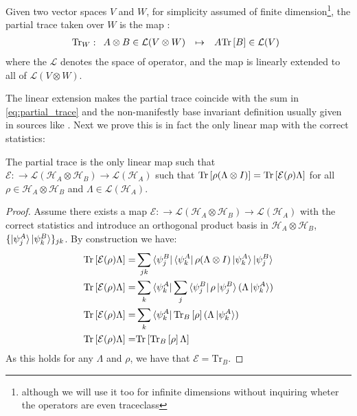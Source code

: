 \begin{definition}
  Given two vector spaces $V$ and $W$, for simplicity assumed of finite dimension\footnote{although we will use it too for infinite dimensions without inquiring wheter the operators are even traceclass}, the partial trace taken over $W$ is the map \cite{nielsen_quantum_2010}:
\[
\mathrm{Tr}_{W}: \begin{array}{rcl}
A\otimes B \in \mathcal{L}(V\otimes W)& \mapsto & A \mathrm{Tr}\left[B\right] \in \mathcal{L}(V)
\end{array}
\]
where the $\mathcal{L}$ denotes the space of operator, and the map is  linearly extended to all of $\mathcal{L}(V\otimes W)$.
\end{definition}
The linear extension makes the partial trace coincide with the sum in \eqref{eq:partial_trace} and the non-manifestly base invariant definition
usually given in sources like \cite{maziero2017computing}. Next we prove this is in fact the only linear map with the correct statistics:
\begin{theorem}
  The partial trace is the only linear map such that $\mathcal{E}:\to \mathcal{L}(\mathcal{H}_{A}\otimes \mathcal{H}_{B}) \to \mathcal{L}(\mathcal{H}_{A})$
  such that $\mathrm{Tr}\left[\rho (\Lambda\otimes I)\right] = \mathrm{Tr}\left[\mathcal{E}(\rho)\Lambda\right]$ for all $\rho \in \mathcal{H}_{A}\otimes \mathcal{H}_{B}$ and
  $\Lambda \in \mathcal{L}(\mathcal{H}_{A})$.
\end{theorem}
\begin{proof}
  Assume there exists a map $\mathcal{E}:\to \mathcal{L}(\mathcal{H}_{A}\otimes \mathcal{H}_{B}) \to \mathcal{L}(\mathcal{H}_{A})$ with the
  correct statistics and introduce an orthogonal product basis in $\mathcal{H}_{A}\otimes \mathcal{H}_{B}$,
  $\{\ket{\psi^{A}_{j}}\ket{\psi^{B}_{k}}\}_{jk}$. By construction we have:
  \begin{align}
    \mathrm{Tr}\left[\mathcal{E}(\rho)\Lambda\right] =& \sum_{jk} \bra{\psi^{B}_{j}}\bra{\psi^{A}_{k}}\rho (\Lambda \otimes I) \ket{\psi^{A}_{k}}\ket{\psi^{B}_{j}}\\
 \mathrm{Tr}\left[\mathcal{E}(\rho)\Lambda\right] =& \sum_{k} \bra{\psi_{k}^{A}}\sum_{j}\bra{\psi^{B}_{j}}\rho\ket{\psi^{B}_{j}}(\Lambda \ket{\psi_{k}^{A}})\\
\mathrm{Tr}\left[\mathcal{E}(\rho)\Lambda\right] =& \sum_{k} \bra{\psi_{k}^{A}}\mathrm{Tr}_{B}\left[\rho\right](\Lambda\ket{\psi_{k}^{A}})\\
\mathrm{Tr}\left[\mathcal{E}(\rho)\Lambda\right] =& \mathrm{Tr}\left[\mathrm{Tr}_{B}\left[\rho\right]\Lambda\right]\\
  \end{align}
  As this holds for any $\Lambda$ and $\rho$, we have that $\mathcal{E}=\mathrm{Tr}_{B}$.
\end{proof}
